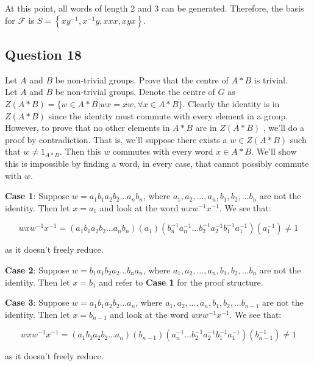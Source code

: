 \documentclass[12pt]{article}%
\begin{document}
At this point, all words of length 2 and 3 can be generated. Therefore, the basis for $\mathcal{F}$ is $S=\left\{xy^{-1}, x^{-1}y, xxx, xyx\right\}$.

\subsection*{Question 18}

Let $A$ and $B$ be non-trivial groups. Prove that the centre of $A*B$ is trivial. \\

Let $A$ and $B$ be non-trivial groups. Denote the centre of $G$ as $Z(A*B)=\{ w \in A*B | wx=xw, \forall x \in A*B \}$. Clearly the identity is in $Z(A*B)$ since the identity must commute with every element in a group. However, to prove that no other elements in $A*B$ are in $Z(A*B)$ , we'll do a proof by contradiction. That is, we'll suppose there exists a $w\in Z(A*B)$ such that $w \neq 1_{A*B}$. Then this $w$ commutes with every word $x \in A*B$. We'll show this is impossible by finding a word, in every case, that cannot possibly commute with $w$.

\textbf{Case 1}: Suppose $w=a_{1}b_{1}a_{2}b_{2}\ldots a_{n}b_{n}$, where $a_1,a_2,\ldots ,a_n, b_1,b_2,\ldots b_n$ are not the identity. Then let $x=a_1$ and look at the word $wxw^{-1}x^{-1}$. We see that:

\begin{dmath}
wxw^{-1}x^{-1}=(a_{1}b_{1}a_{2}b_{2}\ldots a_{n}b_{n})(a_{1})(b_{n}^{-1}a_{n}^{-1}\ldots b_{2}^{-1}a_{2}^{-1}b_{1}^{-1}a_{1}^{-1})(a_{1}^{-1}) \neq 1
\end{dmath}

as it doesn't freely reduce.

\textbf{Case 2}: Suppose $w=b_{1}a_{1}b_{2}a_{2}\ldots b_{n}a_{n}$, where $a_1,a_2,\ldots ,a_n, b_1,b_2,\ldots b_n$ are not the identity. Then let $x=b_1$ and refer to \textbf{Case 1} for the proof structure. 

\textbf{Case 3}: Suppose $w=a_{1}b_{1}a_{2}b_{2}\ldots a_{n}$, where $a_1,a_2,\ldots ,a_n, b_1,b_2,\ldots b_{n-1}$ are not the identity. Then let $x=b_{n-1}$ and look at the word $wxw^{-1}x^{-1}$. We see that:

\begin{dmath}
wxw^{-1}x^{-1}=(a_{1}b_{1}a_{2}b_{2}\ldots a_{n})(b_{n-1})(a_{n}^{-1}\ldots b_{2}^{-1}a_{2}^{-1}b_{1}^{-1}a_{1}^{-1})(b_{n-1}^{-1}) \neq 1
\end{dmath}

as it doesn't freely reduce.
\end{document}
